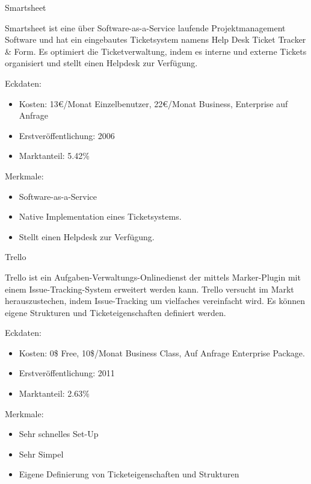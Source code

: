 				
				
				Smartsheet
				
				Smartsheet ist eine über Software-as-a-Service laufende Projektmanagement Software und hat ein eingebautes Ticketsystem namens Help Desk Ticket Tracker \& Form. Es optimiert die Ticketverwaltung, indem es interne und externe Tickets organisiert und stellt einen Helpdesk zur Verfügung. 
				
					Eckdaten:
				\begin{itemize}
					\item Kosten: 13€/Monat Einzelbenutzer, 22€/Monat Business, Enterprise auf Anfrage
					\item Erstveröffentlichung: 2006
					\item Marktanteil: 5.42\%
				\end{itemize}
				
				Merkmale:
				\begin{itemize}
					\item Software-as-a-Service
					\item Native Implementation eines Ticketsystems.
					\item Stellt einen Helpdesk zur Verfügung.
				\end{itemize}
				
				
				
				Trello
				
				Trello ist ein Aufgaben-Verwaltungs-Onlinedienst der mittels Marker-Plugin mit einem Issue-Tracking-System erweitert werden kann. Trello versucht im Markt herauszustechen, indem Issue-Tracking um vielfaches vereinfacht wird. Es können eigene Strukturen und Ticketeigenschaften definiert werden. 
				
					Eckdaten:
				\begin{itemize}
					\item Kosten: 0\$ Free, 10\$/Monat Business Class, Auf Anfrage Enterprise Package.
					\item Erstveröffentlichung: 2011
					\item Marktanteil: 2.63\%
				\end{itemize}
				
				Merkmale:
				\begin{itemize}
					\item Sehr schnelles Set-Up
					\item Sehr Simpel
					\item Eigene Definierung von Ticketeigenschaften und Strukturen
				\end{itemize}
				
